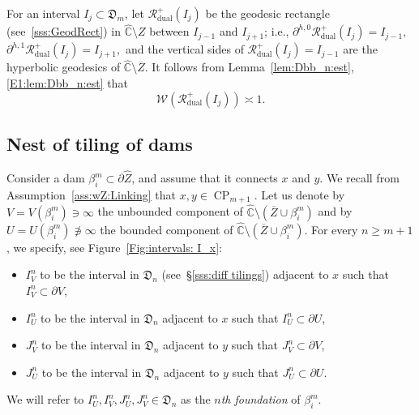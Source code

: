 \documentclass{amsart}
\newcommand{\1}{{\mathbb 1 }}
\newcommand{\Width}{{\mathcal W}}
\newcommand\RR{\mathcal{R}}
\newcommand{\wZ}{{\widehat Z}}
\newcommand\dual{{\operatorname{dual}}}
\newcommand{\wC}{\widehat{\mathbb{C}}}
\newcommand{\Dbb}{{\mathfrak{D}}}
\theoremstyle{remark}
\numberwithin{equation}{section}
\theoremstyle{definition}
\newcommand{\CP}{{\operatorname{CP}}}
\begin{document}
For an interval $I_j\subset \Dbb_m$, let $\RR^+_{\dual}(I_j)$ be the geodesic rectangle (see~\ref{sss:GeodRect}) in $\wC\setminus Z$ between $I_{j-1}$ and $I_{j+1}$; i.e., $\partial^{h,0}\RR^+_\dual (I_j)=I_{j-1},$ $\partial^{h,1}\RR^+_\dual (I_j)=I_{j+1},$ and the vertical sides of $\RR^+_\dual (I_j)=I_{j-1}$ are the hyperbolic geodesics of $\wC\setminus \overline Z$. It follows from Lemma~\ref{lem:Dbb_n:est}, \ref{E1:lem:Dbb_n:est} that 
\begin{equation}
\label{eq:Width:R_dual}
\Width\left(\RR^+_{\dual}(I_j)\right)\asymp 1.
\end{equation}

\subsection{Nest of tiling of dams} 
\label{ss:nest of til:beta}
Consider a dam $\beta^m
_i\subset \partial \wZ$, and assume that it connects $x$ and $y$. We recall from Assumption~\ref{ass:wZ:Linking} that $x,y\in \CP_{m+1}$. Let us denote by $V=V(\beta^m_i)\ni \infty$ the unbounded component of $\wC\setminus (\overline Z\cup \beta^m_i)$ and by $U=U(\beta^m_i)\not\ni \infty$ the bounded component of $\wC\setminus (\overline Z\cup \beta^m_i)$. For every $n\ge m+1$, we specify, see Figure~\ref{Fig:intervals: I_x}:
\begin{itemize}
\item $I^n_V$ to be the interval in $\Dbb_n$ (see~\S\ref{sss:diff tilings}) adjacent to $x$ such that $I^n_V\subset \partial V$,
\item $I^n_U$ to be the interval in $\Dbb_n$ adjacent to $x$ such that $I^n_U\subset \partial U$,
\item $J^n_V$ to be the interval in $\Dbb_n$ adjacent to $y$ such that $J^n_V\subset \partial V$,
\item $J^n_U$ to be the interval in $\Dbb_n$ adjacent to $y$ such that $J^n_U\subset \partial U$.
\end{itemize}
We will refer to $I^n_U, I^n_V,J^n_U, J^n_V\in \Dbb_n$ as the \emph{$n$th foundation} of $\beta^m_i$.
\end{document}
